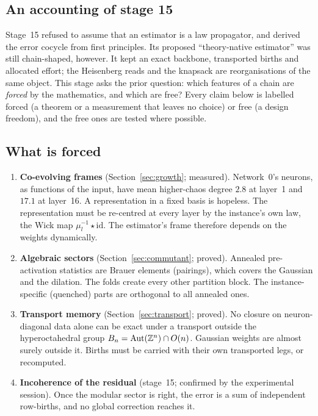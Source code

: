 \label{sec:summary}
\subsection{An accounting of stage 15}
Stage~15 refused to assume that an estimator is a law propagator, and derived the error cocycle from first principles. Its proposed
``theory-native estimator'' was still chain-shaped, however. It kept an exact backbone, transported births and allocated effort; the
Heisenberg reads and the knapsack are reorganisations of the same object. This stage asks the prior question: which features of a chain are
\emph{forced} by the mathematics, and which are free? Every claim below is labelled forced (a theorem or a measurement that leaves no choice)
or free (a design freedom), and the free ones are tested where possible.

\subsection{What is forced}
\begin{enumerate}[leftmargin=*]
\item \textbf{Co-evolving frames} (Section~\ref{sec:growth}; measured). Network~0's neurons, as functions of the input, have mean
higher-chaos degree $2.8$ at layer~1 and $17.1$ at layer~16. A representation in a fixed basis is hopeless. The representation must be
re-centred at every layer by the instance's own law, the Wick map $\mu_l^{-1}\star\mathrm{id}$. The estimator's frame therefore depends on
the weights dynamically.
\item \textbf{Algebraic sectors} (Section~\ref{sec:commutant}; proved). Annealed pre-activation statistics are Brauer elements (pairings),
which covers the Gaussian and the dilation. The folds create every other partition block. The instance-specific (quenched) parts are
orthogonal to all annealed ones.
\item \textbf{Transport memory} (Section~\ref{sec:transport}; proved). No closure on neuron-diagonal data alone can be exact under a
transport outside the hyperoctahedral group $B_n=\mathrm{Aut}(\mathbb Z^n)\cap O(n)$. Gaussian weights are almost surely outside it. Births must be
carried with their own transported legs, or recomputed.
\item \textbf{Incoherence of the residual} (stage~15; confirmed by the experimental session). Once the modular sector is right, the
error is a sum of independent row-births, and no global correction reaches it.
\end{enumerate}

